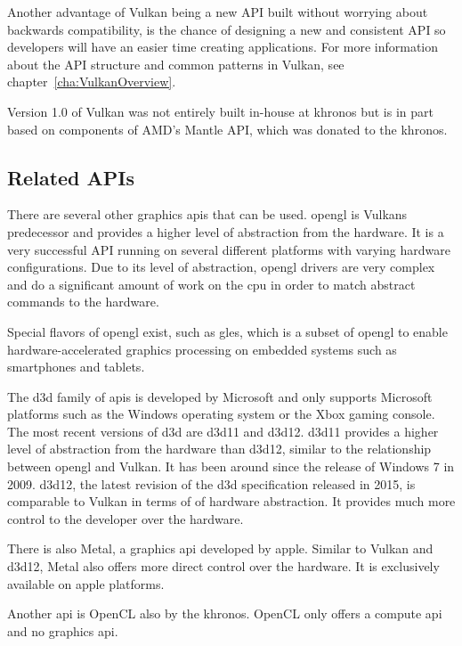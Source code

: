     Another advantage of Vulkan being a new API built without worrying about backwards compatibility, is the chance of designing a new and consistent API so developers will have an easier time creating applications.
    For more information about the API structure and common patterns in Vulkan, see chapter~\ref{cha:VulkanOverview}.

    Version 1.0 of Vulkan was not entirely built in-house at \gls{khronos} but is in part based on components of AMD's Mantle API, which was donated to the \gls{khronos}\cite{vksessiongdc15}.


    \subsection{Related APIs}
      There are several other graphics \glspl{api} that can be used.
      \gls{opengl} is Vulkans predecessor and provides a higher level of abstraction from the hardware.
      It is a very successful API running on several different platforms with varying hardware configurations.
      Due to its level of abstraction, \gls{opengl} drivers are very complex and do a significant amount of work on the \gls{cpu} in order to match abstract commands to the hardware.

      Special flavors of \gls{opengl} exist, such as \gls{gles}, which is a subset of \gls{opengl} to enable hardware-accelerated graphics processing on embedded systems such as smartphones and tablets.

      The \gls{d3d} family of \glspl{api} is developed by Microsoft and only supports Microsoft platforms such as the Windows operating system or the Xbox gaming console.
      The most recent versions of \gls{d3d} are \gls{d3d11} and \gls{d3d12}.
      \gls{d3d11} provides a higher level of abstraction from the hardware than \gls{d3d12}, similar to the relationship between \gls{opengl} and Vulkan.
      It has been around since the release of Windows 7 in 2009.
      \gls{d3d12}, the latest revision of the \gls{d3d} specification released in 2015, is comparable to Vulkan in terms of of hardware abstraction.
      It provides much more control to the developer over the hardware.

      There is also Metal, a graphics \gls{api} developed by \gls{apple}.
      Similar to Vulkan and \gls{d3d12}, Metal also offers more direct control over the hardware.
      It is exclusively available on \gls{apple} platforms.

      Another \gls{api} is OpenCL also by the \gls{khronos}.
      OpenCL only offers a compute \gls{api} and no graphics \gls{api}.
